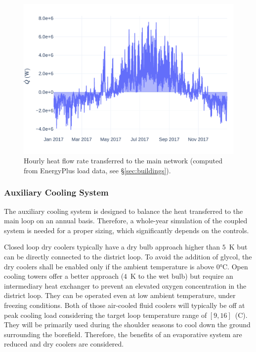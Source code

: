 \begin{figure}[!htbp]
    \centering
    \includegraphics[width=\linewidth]{../python_scripts/figures/QToGround.pdf}
    \caption{Hourly heat flow rate transferred to the main network (computed from EnergyPlus load data, see §\ref{sec:buildings}).}
    \label{fig:q_to_ground}
\end{figure}


\subsubsection{Auxiliary Cooling System} \label{sec:aux_cooling}

The auxiliary cooling system is designed to balance the heat transferred to the main loop on an annual basis.
Therefore, a whole-year simulation of the coupled system is needed for a proper sizing, which significantly depends on the controls.

Closed loop dry coolers typically have a dry bulb approach higher than $5$~K but can be directly connected to the district loop. To avoid the addition of glycol, the dry coolers shall be enabled only if the ambient temperature is above $0$°C.
Open cooling towers offer a better approach ($4$~K to the wet bulb) but require an intermediary heat exchanger to prevent an elevated oxygen concentration in the district loop. They can be operated even at low ambient temperature, under freezing conditions.
Both of those air-cooled fluid coolers will typically be off at peak cooling load considering the target loop temperature range of $[9, 16]$~(C).
They will be primarily used during the shoulder seasons to cool down the ground surrounding the borefield.
Therefore, the benefits of an evaporative system are reduced and dry coolers are considered.

